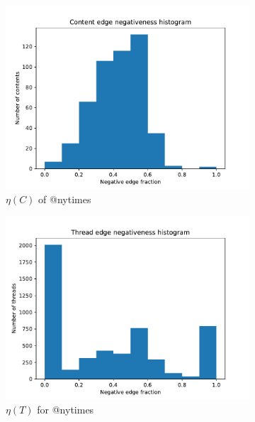 \begin{figure}
	\begin{center}
		\begin{subfigure}[b]{0.4\textwidth}
			\centering
			\includegraphics[width=\textwidth]{tex/out/nytimes700/neg-fraction-content-hist.pdf}
			\caption{$\eta(C)$ of @nytimes}
			\label{fig:nytimes-content-eta}
		\end{subfigure}
		\begin{subfigure}[b]{0.4\textwidth}
			\centering
			\includegraphics[width=\textwidth]{tex/out/nytimes700/neg-fraction-thread-hist.pdf}
			\caption{$\eta(T)$ for @nytimes}
			\label{fig:nytimes-thread-eta}
		\end{subfigure}
		\begin{subfigure}[b]{0.4\textwidth}

\end{subfigure}
\end{center}
\end{figure}
